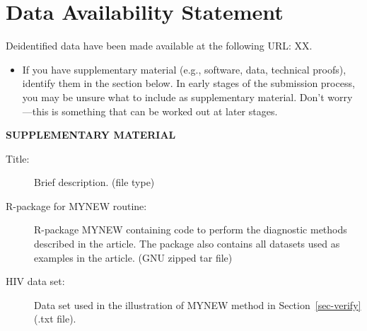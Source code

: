\documentclass[
  12pt]{article}
\providecommand{\tightlist}{%
  \setlength{\itemsep}{0pt}\setlength{\parskip}{0pt}}\usepackage{longtable,booktabs,array}
\begin{document}
  \section{Data Availability Statement}\label{data-availability-statement}
  
    Deidentified data have been made available at the following URL: XX.
 
  



  \begin{itemize}
  \tightlist
  \item
    If you have supplementary material (e.g., software, data, technical
    proofs), identify them in the section below. In early stages of the
    submission process, you may be unsure what to include as supplementary
    material. Don't worry---this is something that can be worked out at
    later stages.
  \end{itemize}
 
  \label{supplementary-material}
  \bigskip
  
  \begin{center}
  
  {\large\bf SUPPLEMENTARY MATERIAL}
  
  \end{center}
  
  \begin{description}
  \item[Title:]
  Brief description. (file type)
  \item[R-package for MYNEW routine:]
  R-package MYNEW containing code to perform the diagnostic methods
  described in the article. The package also contains all datasets used as
  examples in the article. (GNU zipped tar file)
  \item[HIV data set:]
  Data set used in the illustration of MYNEW method in
  Section~\ref{sec-verify} (.txt file).
  \end{description}
\end{document}
